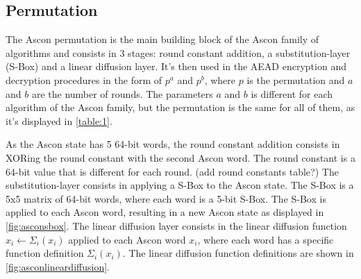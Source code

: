 \documentclass[11pt,twoside]{article}
\begin{document}
\subsection{Permutation}

The Ascon permutation is the main building block of the Ascon family of algorithms and consists in 3 stages: round constant addition, a substitution-layer (S-Box) and a linear diffusion layer. It's then used in the AEAD encryption and decryption procedures in the form of $p^a$ and $p^b$, where $p$ is the permutation and $a$ and $b$ are the number of rounds. The parameters $a$ and $b$ is different for each algorithm of the Ascon family, but the permutation is the same for all of them, as it's displayed in \cref{table:1}.

As the Ascon state has 5 64-bit words, the round constant addition consists in XORing the round constant with the second Ascon word. The round constant is a 64-bit value that is different for each round. \color{orange} (add round constants table?) \color{black} The substitution-layer consists in applying a S-Box to the Ascon state. The S-Box is a 5x5 matrix of 64-bit words, where each word is a 5-bit S-Box. The S-Box is applied to each Ascon word, resulting in a new Ascon state as displayed in \cref{fig:asconsbox}. The linear diffusion layer consists in the linear diffusion function $x_i \leftarrow \Sigma_i(x_i)$ applied to each Ascon word $x_i$, where each word has a specific function definition $\Sigma_i(x_i)$. The linear diffusion function definitions are shown in \cref{fig:asconlineardiffusion}.
\end{document}
